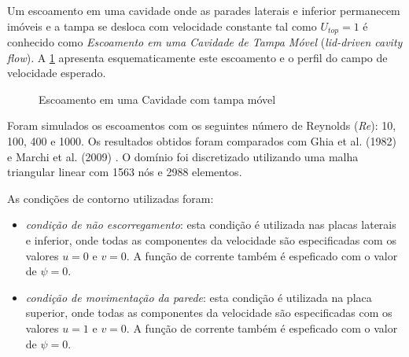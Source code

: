 Um escoamento em uma cavidade onde as parades laterais e inferior
permanecem imóveis e a tampa se desloca com velocidade constante
tal como \textit{$U_{top} = 1$} é conhecido como \textit{Escoamento em uma Cavidade de Tampa Móvel} 
(\textit{lid-driven cavity flow}). 
A \ref{cavity} apresenta esquematicamente este escoamento e
o perfil do campo de velocidade esperado.

\vspace{1cm}
\begin{figure}[H]
\begin{center}
\end{center}
\caption{Escoamento em uma Cavidade com tampa móvel}
\label{cavity}
\end{figure}

\vspace{0.5cm}
Foram simulados os escoamentos com
os seguintes número de Reynolds (\textit{Re}): 10, 100, 400 e 1000. Os
resultados obtidos foram comparados com Ghia et al. (1982) \cite{ghia1982} e Marchi et al. (2009) \cite{marchi2009}.
O domínio foi discretizado utilizando uma malha 
triangular linear com 1563 nós e 2988 elementos. 

\medskip
\noindent
As condições de contorno utilizadas foram:

\begin{itemize}
     \item \textit{condição de não escorregamento}: esta condição é utilizada nas placas laterais e inferior, 
      onde todas as componentes da velocidade são especificadas
      com os valores $u=0$ e $v=0$.
      A função de corrente também é espeficado com o valor de $\psi=0$.

     \item \textit{condição de movimentação da parede}: esta condição é utilizada na placa superior, 
      onde todas as componentes da velocidade são especificadas
      com os valores $u=1$ e $v=0$.
      A função de corrente também é espeficado com o valor de $\psi=0$.
\end{itemize}


